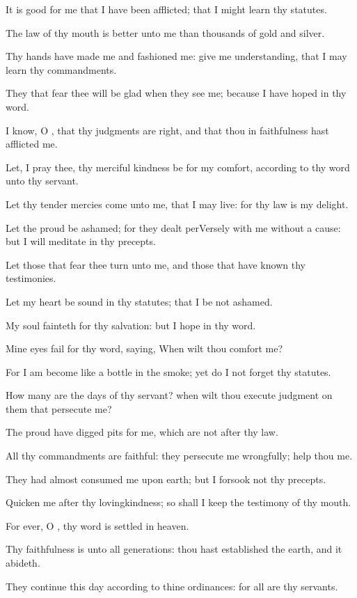 \Verse It is good for me that I have been afflicted; that I might learn thy statutes.

\Verse The law of thy mouth is better unto me than thousands of gold and silver.

\Verse Thy hands have made me and fashioned me: give me understanding, that I may learn thy commandments.

\Verse They that fear thee will be glad when they see me; because I have hoped in thy word.

\Verse I know, O \LORD, that thy judgments are right, and that thou in faithfulness hast afflicted me.

\Verse Let, I pray thee, thy merciful kindness be for my comfort, according to thy word unto thy servant.

\Verse Let thy tender mercies come unto me, that I may live: for thy law is my delight.

\Verse Let the proud be ashamed; for they dealt perVersely with me without a cause: but I will meditate in thy precepts.

\Verse Let those that fear thee turn unto me, and those that have known thy testimonies.

\Verse Let my heart be sound in thy statutes; that I be not ashamed.

\Verse My soul fainteth for thy salvation: but I hope in thy word.

\Verse Mine eyes fail for thy word, saying, When wilt thou comfort me?

\Verse For I am become like a bottle in the smoke; yet do I not forget thy statutes.

\Verse How many are the days of thy servant? when wilt thou execute judgment on them that persecute me?

\Verse The proud have digged pits for me, which are not after thy law.

\Verse All thy commandments are faithful: they persecute me wrongfully; help thou me.

\Verse They had almost consumed me upon earth; but I forsook not thy precepts.

\Verse Quicken me after thy lovingkindness; so shall I keep the testimony of thy mouth.

\Verse For ever, O \LORD, thy word is settled in heaven.

\Verse Thy faithfulness is unto all generations: thou hast established the earth, and it abideth.

\Verse They continue this day according to thine ordinances: for all are thy servants.

